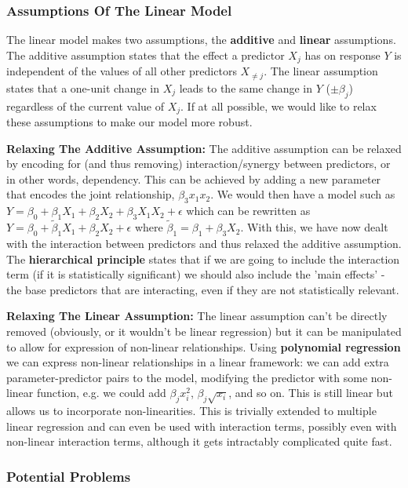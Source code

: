 \subsubsection{Assumptions Of The Linear Model}

The linear model makes two assumptions, the \textbf{additive} and \textbf{linear} assumptions. The additive assumption states that the effect a predictor $X_{j}$ has on response $Y$ is independent of the values of all other predictors $X_{\neq j}$. The linear assumption states that a one-unit change in $X_{j}$ leads to the same change in $Y$ ($\pm \beta_{j}$) regardless of the current value of $X_{j}$. If at all possible, we would like to relax these assumptions to make our model more robust.

\textbf{Relaxing The Additive Assumption:} The additive assumption can be relaxed by encoding for (and thus removing) interaction/synergy between predictors, or in other words, dependency. This can be achieved by adding a new parameter that encodes the joint relationship, $\beta_{3}x_{1}x_{2}$. We would then have a model such as $Y = \beta_{0} + \beta_{1}X_{1} + \beta_{2}X_{2} + \beta_{3}X_{1}X_{2} + \epsilon$ which can be rewritten as $Y = \beta_{0} + \widetilde{\beta}_{1}X_{1} + \beta_{2}X_{2} + \epsilon$ where $\widetilde{\beta}_{1} = \beta_{1} + \beta_{3}X_{2}$. With this, we have now dealt with the interaction between predictors and thus relaxed the additive assumption. The \textbf{hierarchical principle} states that if we are going to include the interaction term (if it is statistically significant) we should also include the 'main effects' - the base predictors that are interacting, even if they are not statistically relevant.

\textbf{Relaxing The Linear Assumption:} The linear assumption can't be directly removed (obviously, or it wouldn't be linear regression) but it can be manipulated to allow for expression of non-linear relationships. Using \textbf{polynomial regression} we can express non-linear relationships in a linear framework: we can add extra parameter-predictor pairs to the model, modifying the predictor with some non-linear function, e.g. we could add $\beta_{j}x_{i}^2$, $\beta_{j}\sqrt{x_{i}}$, and so on. This is still linear but allows us to incorporate non-linearities. This is trivially extended to multiple linear regression and can even be used with interaction terms, possibly even with non-linear interaction terms, although it gets intractably complicated quite fast.

\subsubsection{Potential Problems}

